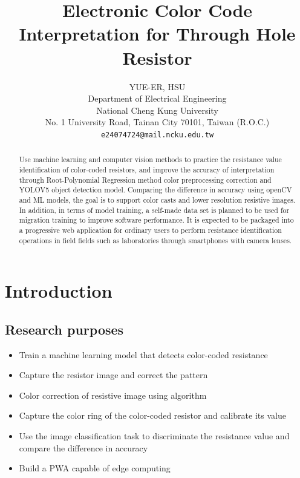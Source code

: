 \documentclass{article}
\title{Electronic Color Code Interpretation for Through Hole Resistor}
\author{{YUE-ER, HSU} \\
	Department of Electrical Engineering\\
	National Cheng Kung University\\
	No. 1 University Road, Tainan City 70101, Taiwan (R.O.C.) \\
	\texttt{e24074724@mail.ncku.edu.tw} \\
}
\begin{document}
\maketitle

\begin{abstract}
Use machine learning and computer vision methods to practice the resistance value identification of color-coded resistors, and improve the accuracy of interpretation through Root-Polynomial Regression method color preprocessing correction and YOLOV5 object detection model. Comparing the difference in accuracy using openCV and ML models, the goal is to support color casts and lower resolution resistive images. In addition, in terms of model training, a self-made data set is planned to be used for migration training to improve software performance. It is expected to be packaged into a progressive web application for ordinary users to perform resistance identification operations in field fields such as laboratories through smartphones with camera lenses.
\end{abstract}




\section{Introduction}

\subsection{Research purposes}

\begin{itemize}
	\item Train a machine learning model that detects color-coded resistance
	\item Capture the resistor image and correct the pattern
	\item Color correction of resistive image using algorithm
	\item Capture the color ring of the color-coded resistor and calibrate its value
	\item Use the image classification task to discriminate the resistance value and compare the difference in accuracy
	\item Build a PWA capable of edge computing
\end{itemize}
\end{document}

